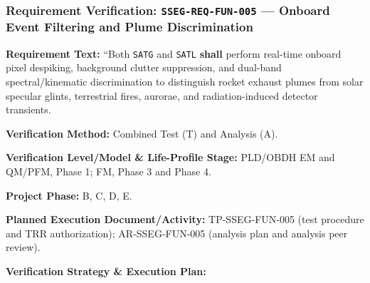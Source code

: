 \subsubsection{Requirement Verification: \texttt{SSEG-REQ-FUN-005} --- Onboard Event Filtering and Plume Discrimination}
\label{ver:SSEG-REQ-FUN-005}
\textbf{Requirement Text:} ``Both \texttt{SATG} and \texttt{SATL} \textbf{shall} perform real-time onboard pixel despiking, background clutter suppression, and dual-band spectral/kinematic discrimination to distinguish rocket exhaust plumes from solar specular glints, terrestrial fires, aurorae, and radiation-induced detector transients.
\par\textbf{Verification Method:} Combined Test (T) and Analysis (A).
\par\textbf{Verification Level/Model \& Life-Profile Stage:} PLD/OBDH EM and QM/PFM, Phase 1; FM, Phase 3 and Phase 4.
\par\textbf{Project Phase:} B, C, D, E.
\par\textbf{Planned Execution Document/Activity:} TP-SSEG-FUN-005 (test procedure and TRR authorization); AR-SSEG-FUN-005 (analysis plan and analysis peer review).
\par\textbf{Verification Strategy \& Execution Plan:}
